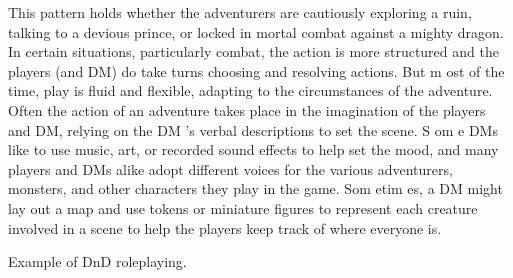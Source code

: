 \documentclass[twoside, 12pt, letterpaper]{report}\usepackage[]{graphicx}\usepackage[]{color}
\begin{document}
\begin{multicols*}{2}
This pattern holds whether the adventurers are cautiously exploring a ruin, talking to a devious prince, or locked in mortal combat against a mighty dragon. In certain situations, particularly combat, the action is more structured and the players (and DM) do take turns choosing and resolving actions. But m ost of the time, play is fluid and flexible, adapting to the circumstances of the adventure. Often the action of an adventure takes place in the imagination of the players and DM, relying on the DM 's verbal descriptions to set the scene. S om e DMs like to use music, art, or recorded sound effects to help set the mood, and many players and DMs alike adopt different voices for the various adventurers, monsters, and other characters they play in the game. Som etim es, a DM might lay out a map and use tokens or miniature figures to represent each creature involved in a scene to help the players keep track of where everyone is.

Example of DnD roleplaying.
\end{multicols*}
\end{document}
